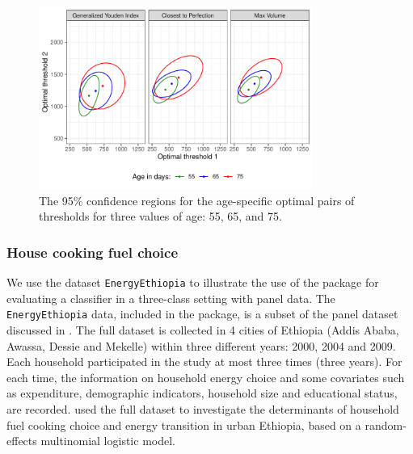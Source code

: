 \begin{figure}[htbp]
  \centering
  \includegraphics[width=0.8\textwidth]{optThres_ellip.pdf}
  \caption{The 95\% confidence regions for the age-specific optimal pairs of thresholds for three values of age: 55, 65, and 75.}
  \label{fig:optThresh}
\end{figure}


\hypertarget{house-cooking-fuel-choice}{%
\subsubsection{House cooking fuel
choice}\label{house-cooking-fuel-choice}}

We use the dataset \texttt{EnergyEthiopia} to illustrate the use of the package for evaluating a classifier in a three-class setting with panel data. The \texttt{EnergyEthiopia} data, included in the package, is a subset of the panel dataset discussed in \citet{alem2016modeling}. The full dataset is collected in 4 cities of Ethiopia (Addis Ababa, Awassa, Dessie and Mekelle) within three different years: 2000, 2004 and 2009. Each household participated in the study at most three times (three years). For each time, the information on household energy choice and some covariates such as expenditure, demographic indicators, household size and educational status, are recorded. \citet{alem2016modeling} used the full dataset to investigate the determinants of household fuel cooking choice and energy transition in urban Ethiopia, based on a random-effects multinomial logistic model.


